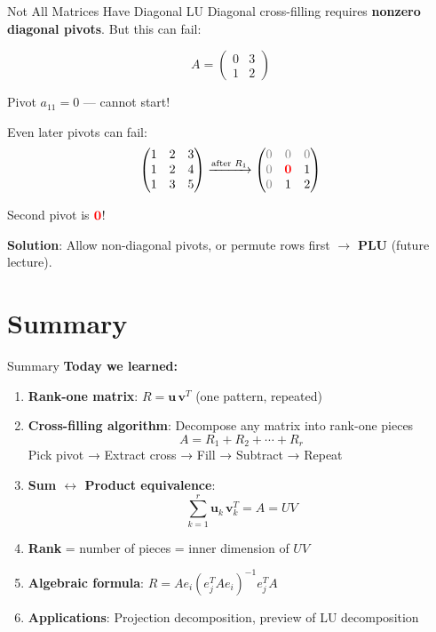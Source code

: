 \documentclass[10pt]{beamer}
\theoremstyle{definition}
\newcommand{\pvt}[1]{{\color{red}\mathbf{#1}}}       %
\newcommand{\rem}[1]{{\color{gray}#1}}                %
\newcommand{\x}[1]{\alert{\textbf{#1}}}
\begin{document}
\begin{frame}{Not All Matrices Have Diagonal LU}
Diagonal cross-filling requires \x{nonzero diagonal pivots}. But this can fail:

$$A = \begin{pmatrix} 0 & 3 \\ 1 & 2 \end{pmatrix}$$

Pivot $a_{11} = 0$ — cannot start!

\vspace{0.3cm}
Even later pivots can fail:
$$\begin{pmatrix} 1 & 2 & 3 \\ 1 & 2 & 4 \\ 1 & 3 & 5 \end{pmatrix}
\xrightarrow{\text{after } R_1} \begin{pmatrix}
\rem{0} & \rem{0} & \rem{0} \\
\rem{0} & \pvt{0} & 1 \\
\rem{0} & 1 & 2
\end{pmatrix}$$

Second pivot is $\pvt{0}$!

\vspace{0.2cm}
\textbf{Solution}: Allow non-diagonal pivots, or permute rows first $\to$ \x{PLU} (future lecture).
\end{frame}

\section{Summary}

\begin{frame}{Summary}
\textbf{Today we learned:}

\begin{enumerate}
\item \textbf{Rank-one matrix}: $R = \mathbf{u}\,\mathbf{v}^T$ (one pattern, repeated)

\item \textbf{Cross-filling algorithm}: Decompose any matrix into rank-one pieces
$$A = R_1 + R_2 + \cdots + R_r$$
Pick pivot → Extract cross → Fill → Subtract → Repeat

\item \textbf{Sum $\leftrightarrow$ Product equivalence}:
$$\sum_{k=1}^r \mathbf{u}_k\,\mathbf{v}_k^T = A = UV$$

\item \textbf{Rank} = number of pieces = inner dimension of $UV$

\item \textbf{Algebraic formula}: $R = Ae_i(e_j^TAe_i)^{-1}e_j^TA$

\item \textbf{Applications}: Projection decomposition, preview of LU decomposition
\end{enumerate}
\end{frame}
\end{document}

